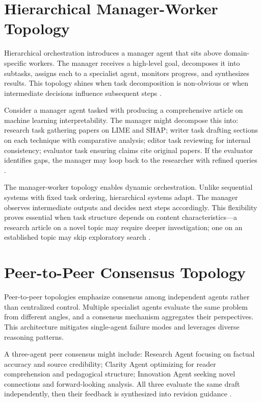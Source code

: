 \section{Hierarchical Manager-Worker Topology}

Hierarchical orchestration introduces a manager agent that sits above domain-specific workers. The manager receives a high-level goal, decomposes it into subtasks, assigns each to a specialist agent, monitors progress, and synthesizes results. This topology shines when task decomposition is non-obvious or when intermediate decisions influence subsequent steps \cite{CrewAI2024}.

Consider a manager agent tasked with producing a comprehensive article on machine learning interpretability. The manager might decompose this into: research task gathering papers on LIME and SHAP; writer task drafting sections on each technique with comparative analysis; editor task reviewing for internal consistency; evaluator task ensuring claims cite original papers. If the evaluator identifies gaps, the manager may loop back to the researcher with refined queries \cite{Segal2026}.

The manager-worker topology enables dynamic orchestration. Unlike sequential systems with fixed task ordering, hierarchical systems adapt. The manager observes intermediate outputs and decides next steps accordingly. This flexibility proves essential when task structure depends on content characteristics—a research article on a novel topic may require deeper investigation; one on an established topic may skip exploratory search \cite{CrewAI2024}.

\section{Peer-to-Peer Consensus Topology}

Peer-to-peer topologies emphasize consensus among independent agents rather than centralized control. Multiple specialist agents evaluate the same problem from different angles, and a consensus mechanism aggregates their perspectives. This architecture mitigates single-agent failure modes and leverages diverse reasoning patterns.

A three-agent peer consensus might include: Research Agent focusing on factual accuracy and source credibility; Clarity Agent optimizing for reader comprehension and pedagogical structure; Innovation Agent seeking novel connections and forward-looking analysis. All three evaluate the same draft independently, then their feedback is synthesized into revision guidance \cite{Segal2026}.

